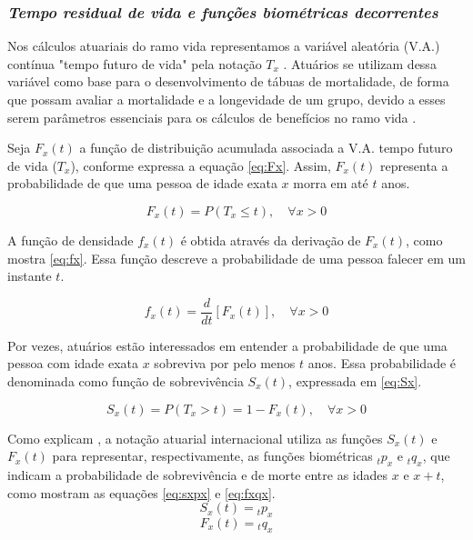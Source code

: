 \subsubsection{\textit{Tempo residual de vida e funções biométricas decorrentes}}

Nos cálculos atuariais do ramo vida representamos a variável aleatória (V.A.) contínua "tempo futuro de vida"{} pela notação $T_x$ \cite{bowers2006, dickson2019, macdonald2018}. Atuários se utilizam dessa variável como base para o desenvolvimento de tábuas de mortalidade, de forma que possam avaliar a mortalidade e a longevidade de um grupo, devido a esses serem parâmetros essenciais para os cálculos de benefícios no ramo vida \cite{dickson2019,promislow2015}.

Seja $F_x(t)$ a função de distribuição acumulada associada a V.A. tempo futuro de vida ($T_x$), conforme expressa a equação \ref{eq:Fx}. Assim, $F_x(t)$ representa a probabilidade de que uma pessoa de idade exata $x$ morra em até $t$ anos.

\begin{equation}
    F_x (t)= P(T_x \leq t), \quad \forall x > 0
    \label{eq:Fx}
\end{equation}

A função de densidade $f_x(t)$ é obtida através da derivação de $F_x(t)$, como mostra \ref{eq:fx}. Essa função descreve a probabilidade de uma pessoa falecer em um instante $t$.

\begin{equation}
    f_x (t)= \frac{d}{dt}[F_x(t)], \quad \forall x > 0
    \label{eq:fx}
\end{equation}

Por vezes, atuários estão interessados em entender a probabilidade de que uma pessoa com idade exata $x$ sobreviva por pelo menos $t$ anos. Essa probabilidade é denominada como função de sobrevivência $S_x(t)$, expressada em \ref{eq:Sx}.

\begin{equation}
    S_x (t)= P(T_x>t)=1-F_x(t), \quad \forall x > 0
    \label{eq:Sx}
\end{equation}

Como explicam , a notação atuarial internacional utiliza as funções $S_x(t)$ e $F_x(t)$ para representar, respectivamente, as funções biométricas ${}_tp_x$ e ${}_tq_x$, que indicam a probabilidade de sobrevivência e de morte entre as idades $x$ e $x + t$, como mostram as equações \ref{eq:sxpx} e \ref{eq:fxqx}.
\begin{equation}
    S_x(t) = {}_tp_x
    \label{eq:sxpx}
\end{equation}
\begin{equation}
    F_x(t) = {}_tq_x
    \label{eq:fxqx}
\end{equation}

